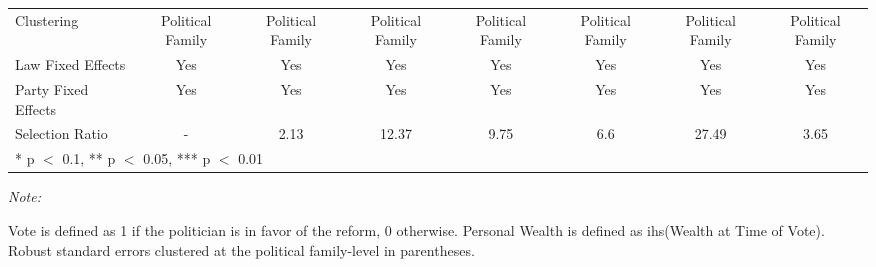 \begin{table}[!h]
{\begin{threeparttable}
\begin{tabular}[t]{lccccccc}
Clustering & Political Family & Political Family & Political Family & Political Family & Political Family & Political Family & Political Family\\
Law Fixed Effects & Yes & Yes & Yes & Yes & Yes & Yes & Yes\\
Party Fixed Effects & Yes & Yes & Yes & Yes & Yes & Yes & Yes\\
Selection Ratio & - & 2.13 & 12.37 & 9.75 & 6.6 & 27.49 & 3.65\\
\bottomrule
\multicolumn{8}{l}{\rule{0pt}{1em}* p $<$ 0.1, ** p $<$ 0.05, *** p $<$ 0.01}\\
\end{tabular}
\begin{tablenotes}[para]
\item \textit{Note:} 
\item Vote is defined as 1 if the politician is in favor of the reform, 0 otherwise. Personal Wealth is defined as ihs(Wealth at Time of Vote). Robust standard errors clustered at the political family-level in parentheses.
\end{tablenotes}
\end{threeparttable}}
\end{table}
